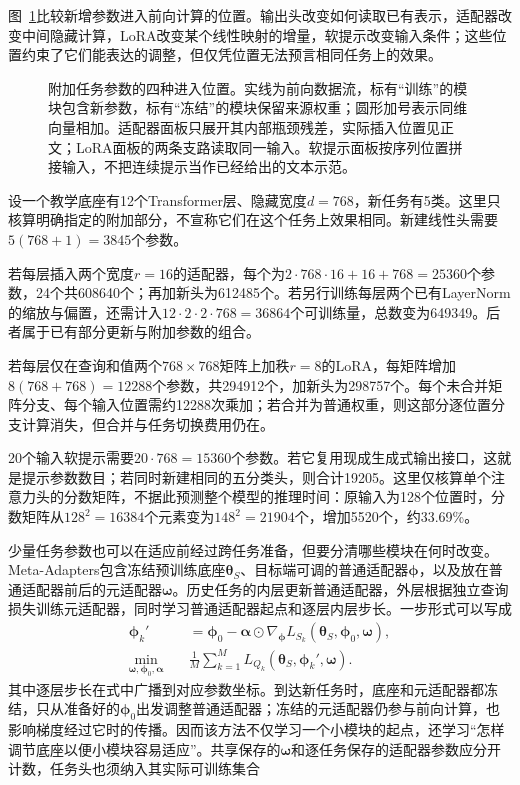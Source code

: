 图~\ref{fig:ket-transfer-added-locations}比较新增参数进入前向计算的位置。输出头改变如何读取已有表示，适配器改变中间隐藏计算，LoRA改变某个线性映射的增量，软提示改变输入条件；这些位置约束了它们能表达的调整，但仅凭位置无法预言相同任务上的效果。

\begin{figure}[htbp]
  \centering
  
  \caption{附加任务参数的四种进入位置。实线为前向数据流，标有“训练”的模块包含新参数，标有“冻结”的模块保留来源权重；圆形加号表示同维向量相加。适配器面板只展开其内部瓶颈残差，实际插入位置见正文；LoRA面板的两条支路读取同一输入。软提示面板按序列位置拼接输入，不把连续提示当作已经给出的文本示范。}
  \label{fig:ket-transfer-added-locations}
\end{figure}
\FloatBarrier

\begin{example}[固定底座下的参数与计算核算]
  \label{ex:ket-transfer-parameter-counts}
  设一个教学底座有12个Transformer层、隐藏宽度$d=768$，新任务有5类。这里只核算明确指定的附加部分，不宣称它们在这个任务上效果相同。新建线性头需要$5(768+1)=3845$个参数。

  若每层插入两个宽度$r=16$的适配器，每个为$2\cdot768\cdot16+16+768=25360$个参数，24个共608640个；再加新头为612485个。若另行训练每层两个已有LayerNorm的缩放与偏置，还需计入$12\cdot2\cdot2\cdot768=36864$个可训练量，总数变为649349。后者属于已有部分更新与附加参数的组合。

  若每层仅在查询和值两个$768\times768$矩阵上加秩$r=8$的LoRA，每矩阵增加$8(768+768)=12288$个参数，共294912个，加新头为298757个。每个未合并矩阵分支、每个输入位置需约12288次乘加；若合并为普通权重，则这部分逐位置分支计算消失，但合并与任务切换费用仍在。

  20个输入软提示需要$20\cdot768=15360$个参数。若它复用现成生成式输出接口，这就是提示参数数目；若同时新建相同的五分类头，则合计19205。这里仅核算单个注意力头的分数矩阵，不据此预测整个模型的推理时间：原输入为128个位置时，分数矩阵从$128^2=16384$个元素变为$148^2=21904$个，增加5520个，约33.69\%。
\end{example}

少量任务参数也可以在适应前经过跨任务准备，但要分清哪些模块在何时改变。Meta-Adapters包含冻结预训练底座$\bm{\theta}_S$、目标端可调的普通适配器$\bm\phi$，以及放在普通适配器前后的元适配器$\bm\omega$。历史任务的内层更新普通适配器，外层根据独立查询损失训练元适配器，同时学习普通适配器起点和逐层内层步长。一步形式可以写成
\begin{align}
  \bm\phi_k'
    &=\bm\phi_0-\bm\alpha\odot
       \nabla_{\bm\phi}L_{S_k}
         (\bm{\theta}_S,\bm\phi_0,\bm\omega), \nonumber\\
  \min_{\bm\omega,\bm\phi_0,\bm\alpha}\quad
  &\frac1M\sum_{k=1}^{M}
    L_{Q_k}(\bm{\theta}_S,\bm\phi_k',\bm\omega).
  \label{eq:ket-transfer-meta-adapters}
\end{align}
其中逐层步长在式中广播到对应参数坐标。到达新任务时，底座和元适配器都冻结，只从准备好的$\bm\phi_0$出发调整普通适配器；冻结的元适配器仍参与前向计算，也影响梯度经过它时的传播。因而该方法不仅学习一个小模块的起点，还学习“怎样调节底座以便小模块容易适应”。共享保存的$\bm\omega$和逐任务保存的适配器参数应分开计数，任务头也须纳入其实际可训练集合

